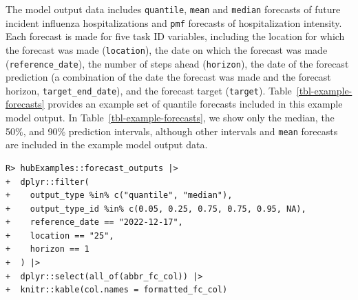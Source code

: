 \documentclass[
  article,
  shortnames,
  notitle]{jss}
\begin{document}
The model output data includes \texttt{quantile}, \texttt{mean} and
\texttt{median} forecasts of future incident influenza hospitalizations
and \texttt{pmf} forecasts of hospitalization intensity. Each forecast
is made for five task ID variables, including the location for which the
forecast was made (\texttt{location}), the date on which the forecast
was made (\texttt{reference\_date}), the number of steps ahead
(\texttt{horizon}), the date of the forecast prediction (a combination
of the date the forecast was made and the forecast horizon,
\texttt{target\_end\_date}), and the forecast target (\texttt{target}).
Table~\ref{tbl-example-forecasts} provides an example set of quantile
forecasts included in this example model output. In
Table~\ref{tbl-example-forecasts}, we show only the median, the 50\%,
and 90\% prediction intervals, although other intervals and
\texttt{mean} forecasts are included in the example model output data.

\begin{verbatim}
R> hubExamples::forecast_outputs |>
+  dplyr::filter(
+    output_type %in% c("quantile", "median"),
+    output_type_id %in% c(0.05, 0.25, 0.75, 0.75, 0.95, NA),
+    reference_date == "2022-12-17",
+    location == "25",
+    horizon == 1
+  ) |>
+  dplyr::select(all_of(abbr_fc_col)) |>
+  knitr::kable(col.names = formatted_fc_col)
\end{verbatim}
\end{document}
